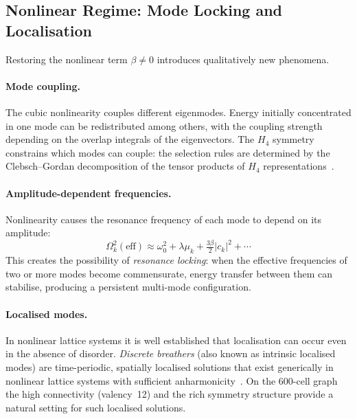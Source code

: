 \documentclass[12pt,a4paper]{article}
\newcommand{\Hfour}{H_4}
\begin{document}
\subsection{Nonlinear Regime: Mode Locking and Localisation}

Restoring the nonlinear term $\beta \ne 0$ introduces qualitatively new
phenomena.

\paragraph{Mode coupling.}
The cubic nonlinearity couples different eigenmodes.  Energy initially
concentrated in one mode can be redistributed among others, with the coupling
strength depending on the overlap integrals of the eigenvectors.  The $\Hfour$
symmetry constrains which modes can couple: the selection rules are determined
by the Clebsch--Gordan decomposition of the tensor products of $\Hfour$
representations~\cite{serre1977}.

\paragraph{Amplitude-dependent frequencies.}
Nonlinearity causes the resonance frequency of each mode to depend on its
amplitude:
\begin{equation}\label{eq:freq_shift}
  \Omega_k^2(\text{eff})
  \approx \omega_0^2 + \lambda\mu_k + \tfrac{3\beta}{2}\lvert c_k\rvert^2
  + \cdots
\end{equation}
This creates the possibility of \emph{resonance locking}: when the effective
frequencies of two or more modes become commensurate, energy transfer between
them can stabilise, producing a persistent multi-mode configuration.

\paragraph{Localised modes.}
In nonlinear lattice systems it is well established that localisation can occur
even in the absence of disorder.  \emph{Discrete breathers} (also known as
intrinsic localised modes) are time-periodic, spatially localised solutions
that exist generically in nonlinear lattice systems with sufficient
anharmonicity~\cite{flach2008,mackay1994}.  On the 600-cell graph the high
connectivity (valency~12) and the rich symmetry structure provide a natural
setting for such localised solutions.
\end{document}
